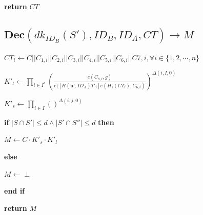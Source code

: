\documentclass[a4paper]{article}
\begin{document}
\textbf{return} $\textit{CT}$

\subsection{$\textbf{Dec}(\textit{dk}_{\textit{ID}_B}(S'), \textit{ID}_B, \textit{ID}_A, \textit{CT}) \rightarrow M$}

$\textit{CT}_i \gets C || C_{1, i} || C_{2, i} || C_{3, i} || C_{4, i} || C_{5, i} || C_{6, i} || C{7, i}, \forall i \in \{1, 2, \cdots, n\}$

$K'_l \gets \prod\limits_{i \in I^*} \left(\frac{e(C_{8, i}, g)}{e([H(\bm{u}', \textit{ID}_A) T'_i] e(H_1(\textit{CT}_i), C_{6, i})}\right)^{\Delta(i, I, 0)}$

$K'_s \gets \prod\limits_{i \in I} \left(\right)^{\Delta(i, j, 0)}$

\textbf{if} $|S \cap S'| \leqslant d \land |S' \cap S''| \leqslant d$ \textbf{then}

	\quad$M \gets C \cdot K'_s \cdot K'_l$

\textbf{else}

	\quad$M \gets \perp$

\textbf{end if}

\textbf{return} $M$
\end{document}
